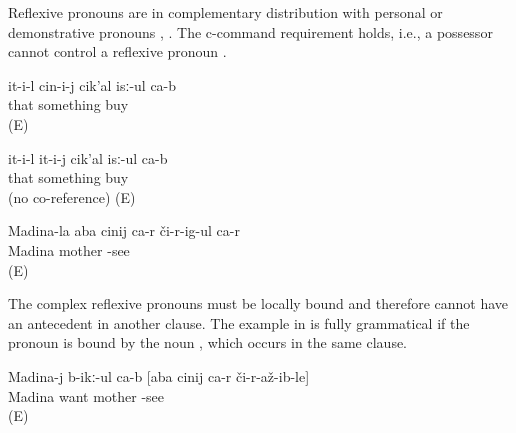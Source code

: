 Reflexive pronouns are in complementary distribution with personal or demonstrative pronouns , . The c-command requirement holds, i.e., a possessor cannot control a reflexive pronoun .
%
\begin{exe}
	\ex	\label{ex:S/he buys himself something}
	\gll	it-i-l	cin-i-j	cik'al	isː-ul	ca-b\\
		that		something	buy	\\
	\glt	{} (E)

	\ex	\label{ex:S/he buys him/her something}
	\gll	it-i-l	it-i-j	cik'al	isː-ul	ca-b\\
		that		something	buy		\\
	\glt	{} (no co-reference) (E)

	\ex	\label{ex:Madina's mother sees herself@11a}
	\gll	Madina-la	aba	cinij	ca-r	či-r-ig-ul ca-r\\
		Madina	mother			-see \\
	\glt	{} (E)
\end{exe}

The complex reflexive pronouns must be locally bound  and therefore cannot have an antecedent in another clause. The example in  is fully grammatical if the pronoun is bound by the noun  , which occurs in the same clause.
%
\begin{exe}
	\ex	\label{ex:Madina wants that the mother sees herself@11b}
	\gll	Madina-j	b-ikː-ul ca-b	[aba	cinij	ca-r	či-r-až-ib-le]\\
		Madina	want 	mother			-see\\
	\glt	{} (E)
\end{exe}

